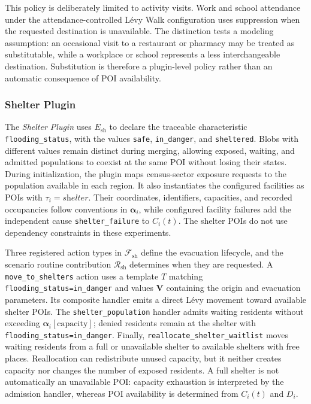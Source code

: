 This policy is deliberately limited to activity visits. Work and school attendance under the attendance-controlled L\'evy Walk configuration uses suppression when the requested destination is unavailable. The distinction tests a modeling assumption: an occasional visit to a restaurant or pharmacy may be treated as substitutable, while a workplace or school represents a less interchangeable destination. Substitution is therefore a plugin-level policy rather than an automatic consequence of POI availability.

\subsubsection{Shelter Plugin}

The \textit{Shelter Plugin} uses $E_{\mathrm{sh}}$ to declare the traceable characteristic \texttt{flooding\_status}, with the values \texttt{safe}, \texttt{in\_danger}, and \texttt{sheltered}. Blobs with different values remain distinct during merging, allowing exposed, waiting, and admitted populations to coexist at the same POI without losing their states. During initialization, the plugin maps census-sector exposure requests to the population available in each region. It also instantiates the configured facilities as POIs with $\tau_i=\textit{shelter}$. Their coordinates, identifiers, capacities, and recorded occupancies follow conventions in $\bm{\alpha}_i$, while configured facility failures add the independent cause \texttt{shelter\_failure} to $C_i(t)$. The shelter POIs do not use dependency constraints in these experiments.

Three registered action types in $\mathcal{F}_{\mathrm{sh}}$ define the evacuation lifecycle, and the scenario routine contribution $\mathcal{R}_{\mathrm{sh}}$ determines when they are requested. A \texttt{move\_to\_shelters} action uses a template $T$ matching \texttt{flooding\_status=in\_danger} and values $\bm{V}$ containing the origin and evacuation parameters. Its composite handler emits a direct L\'evy movement toward available shelter POIs. %
The \texttt{shelter\_population} handler admits waiting residents without exceeding $\bm{\alpha}_i[\mathrm{capacity}]$; denied residents remain at the shelter with \texttt{flooding\_status=in\_danger}. Finally, \texttt{reallocate\_shelter\_waitlist} moves waiting residents from a full or unavailable shelter to available shelters with free places. Reallocation can redistribute unused capacity, but it neither creates capacity nor changes the number of exposed residents. A full shelter is not automatically an unavailable POI: capacity exhaustion is interpreted by the admission handler, whereas POI availability is determined from $C_i(t)$ and $D_i$.

